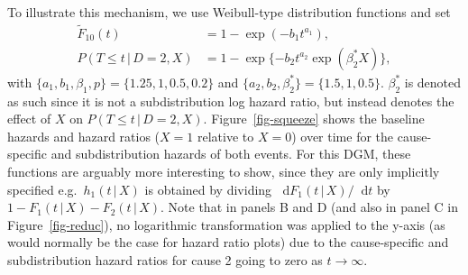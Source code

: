 \documentclass[
  letterpaper,
  DIV=11,
  numbers=noendperiod]{scrreprt}
\newcommand{\given}{\,|\,}
\newcommand\diff{\mathop{}\!\mathrm{d}}
\begin{document}
To illustrate this mechanism, we use Weibull-type distribution functions
and set \begin{align*}
    \tilde{F}_{10}(t) &= 1 - \exp(-b_1t^{a_1}), \\
    P(T \leq t \given D=2, X) &= 1 - \exp\{-b_2t^{a_2}\exp(\beta^*_2 X)\},
\end{align*} with \(\{a_1, b_1, \beta_1, p\} = \{1.25, 1, 0.5, 0.2\}\)
and \(\{a_2, b_2,\beta^*_2\} = \{1.5, 1, 0.5\}\). \(\beta^*_2\) is
denoted as such since it is not a subdistribution log hazard ratio, but
instead denotes the effect of \(X\) on \(P(T \leq t \given D=2, X)\).
Figure~\ref{fig-squeeze} shows the baseline hazards and hazard ratios
(\(X = 1\) relative to \(X = 0\)) over time for the cause-specific and
subdistribution hazards of both events. For this DGM, these functions
are arguably more interesting to show, since they are only implicitly
specified e.g.~\(h_1(t \given X)\) is obtained by dividing
\(\diff F_1(t \given X)/\diff t\) by
\(1 - F_1(t \given X) - F_2(t \given X)\). Note that in panels B and D
(and also in panel C in Figure~\ref{fig-reduc}), no logarithmic
transformation was applied to the y-axis (as would normally be the case
for hazard ratio plots) due to the cause-specific and subdistribution
hazard ratios for cause 2 going to zero as \(t \to \infty\).
\end{document}
